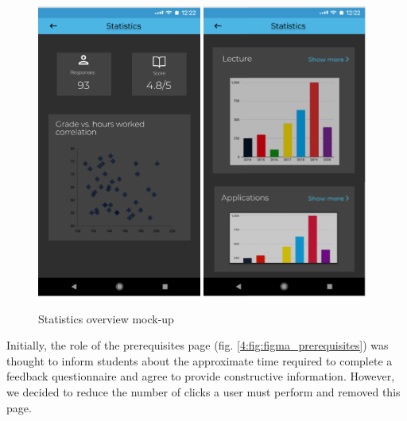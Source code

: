 \begin{figure}[!ht]
\begin{minipage}[t]{0.663\textwidth}
            \captionsetup{justification=centering}
            \includegraphics[width=0.48\textwidth]{figures/app/initial/statistics_1.png}
            \includegraphics[width=0.48\textwidth]{figures/app/initial/statistics_2.png}
            \caption{Statistics overview mock-up}
            \label{4:fig:figma_statistics}
        \end{minipage}
    \end{figure}
    
    Initially, the role of the prerequisites page (fig. \ref{4:fig:figma_prerequisites}) was thought to inform students about the approximate time required to complete a feedback questionnaire and agree to provide constructive information. However, we decided to reduce the number of clicks a user must perform and removed this page.
    
